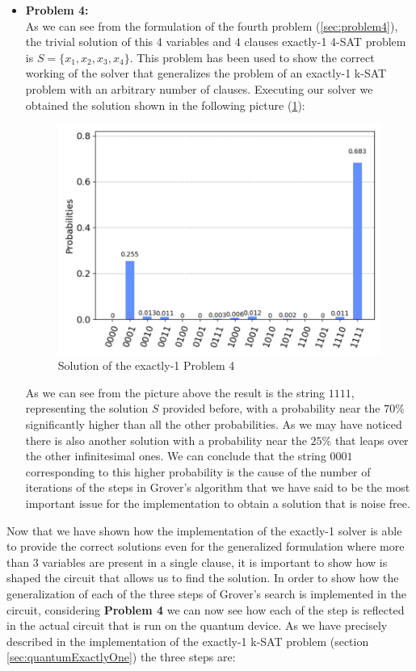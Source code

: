 \documentclass[english]{article}
\begin{document}
\begin{itemize}
					\item \textbf{Problem 4:} \\
						As we can see from the formulation of the fourth problem (\ref{sec:problem4}), the trivial solution of this 4 variables and 4 clauses exactly-1 4-SAT problem is $S=\{x_1, x_2, x_3, x_4\}$. This problem has been used to show the correct working of the solver that generalizes the problem of an exactly-1 k-SAT problem with an arbitrary number of clauses. Executing our solver we obtained the solution shown in the following picture (\ref{fig:problem4Solution}):
						\begin{figure}[h]
							\centering
							\includegraphics[scale=0.46]{Problem_4_Solution.png}
							\caption{
								\label{fig:problem4Solution}
								Solution of the exactly-1 Problem 4
							}
						\end{figure}
					
						As we can see from the picture above the result is the string $1111$, representing the solution $S$ provided before, with a probability near the $70\%$ significantly higher than all the other probabilities. As we may have noticed there is also another solution with a probability near the $25\%$ that leaps over the other infinitesimal ones. We can conclude that the string $0001$ corresponding to this higher probability is the cause of the number of iterations of the steps in Grover's algorithm that we have said to be the most important issue for the implementation to obtain a solution that is noise free.
				\end{itemize}
				Now that we have shown how the implementation of the exactly-1 solver is able to provide the correct solutions even for the generalized formulation where more than 3 variables are present in a single clause, it is important to show how is shaped the circuit that allows us to find the solution. In order to show how the generalization of each of the three steps of Grover's search is implemented in the circuit, considering \textbf{Problem 4} we can now see how each of the step is reflected in the actual circuit that is run on the quantum device. As we have precisely described in the implementation of the exactly-1 k-SAT problem (section \ref{sec:quantumExactlyOne}) the three steps are:
\end{document}
